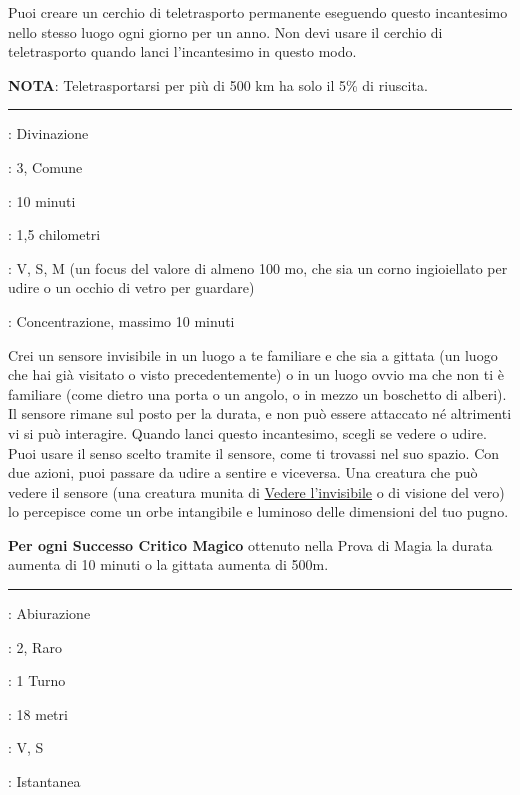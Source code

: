 \begin{multicols}{2}
Puoi creare un cerchio di teletrasporto permanente eseguendo questo incantesimo nello stesso luogo ogni giorno per un anno. Non devi usare il cerchio di teletrasporto quando lanci l'incantesimo in questo modo.

\textbf{NOTA}: Teletrasportarsi per più di 500 km ha solo il 5\% di riuscita.

\smallskip\noindent\rule{\linewidth}{2pt} \hypertarget{Chiaroveggenza}{}\medskip{}
\noindent
\begin{description}[noitemsep, topsep=0pt, parsep=0pt, partopsep=0pt, leftmargin=0cm, labelwidth=2.8cm]
	\item[\textbf{Lista di Magia}]: Divinazione
	\item[\textbf{Livello}]: 3, Comune
	\item[\textbf{T. di Lancio}]: 10 minuti
	\item[\textbf{Gittata}]: 1,5 chilometri
	\item[\textbf{Componenti}]: V, S, M (un focus del valore di almeno 100 mo, che sia un corno ingioiellato per udire o un occhio di vetro per guardare)
	\item[\textbf{Durata}]: Concentrazione, massimo 10 minuti
\end{description}

Crei un sensore invisibile in un luogo a te familiare e che sia a gittata (un luogo che hai già visitato o visto precedentemente) o in un luogo ovvio ma che non ti è familiare (come dietro una porta o un angolo, o in mezzo un boschetto di alberi). Il sensore rimane sul posto per la durata, e non può essere attaccato né altrimenti vi si può interagire. Quando lanci questo incantesimo, scegli se vedere o udire. Puoi usare il senso scelto tramite il sensore, come ti trovassi nel suo spazio. Con due azioni, puoi passare da udire a sentire e viceversa. Una creatura che può vedere il sensore (una creatura munita di \hyperlink{Vedere l'invisibile}{Vedere l'invisibile} o di visione del vero) lo percepisce come un orbe intangibile e luminoso delle dimensioni del tuo pugno.

\textbf{Per ogni Successo Critico Magico} ottenuto nella Prova di Magia la durata aumenta di 10 minuti o la gittata aumenta di 500m.

\smallskip\noindent\rule{\linewidth}{2pt} \hypertarget{Chiudi Portale}{}\medskip{}\label{Chiudi Portale}
\noindent
\begin{description}[noitemsep, topsep=0pt, parsep=0pt, partopsep=0pt, leftmargin=0cm, labelwidth=2.8cm]
	\item[\textbf{Lista di Magia}]: Abiurazione
	\item[\textbf{Livello}]: 2, Raro
	\item[\textbf{T. di Lancio}]:  1 Turno
	\item[\textbf{Gittata}]: 18 metri
	\item[\textbf{Componenti}]: V, S
	\item[\textbf{Durata}]: Istantanea
\end{description}


\end{multicols}
